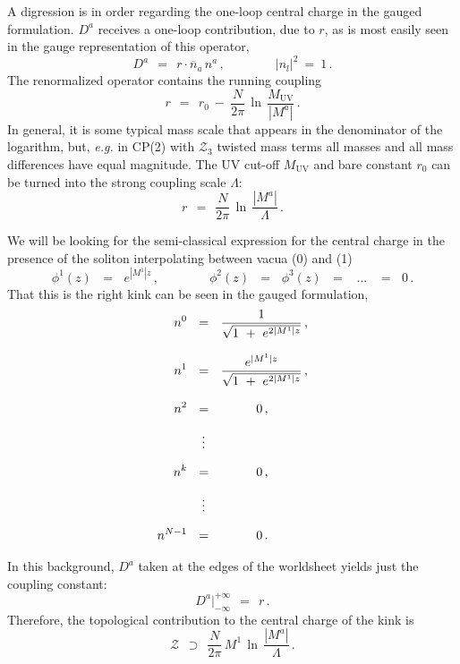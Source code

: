 \documentclass[epsfig,12pt]{article}
\def\beq{\begin{equation}}
\def\eeq{\end{equation}}
\def\beq{\begin{equation}}
\def\eeq{\end{equation}}
\newcommand{\ov}{\overline}
\newcommand{\mc}[1]{\mathcal{#1}}
\begin{document}
 
 
     
\newpage

A digression is in order regarding the one-loop central charge in the gauged formulation.
 $ D^a $ receives a one-loop contribution, due to $ r $, as is 
       most easily seen in the gauge representation of this operator,
\beq
       D^a  ~~=~~ r \cdot \ov{n}{}_a\, n^a \,,\qquad\qquad   | n_l |^2 ~=~ 1\,.
\eeq
       The renormalized operator contains the running coupling 
\beq
       r    ~~=~~ r_0  ~-~ \frac{N}{2\pi}\,\ln\, \frac{M_\text{UV}}
                                                      {   |M^a|   } \,.
\eeq
       In general, it is some typical mass scale that appears in the denominator of the logarithm, but, {\it e.g.}
       in CP(2) with $\mc{Z}_3$ twisted mass terms all masses and all mass differences have equal magnitude. 
       The UV cut-off $ M_\text{UV} $ and bare constant $ r_0 $ can be turned 
       into the strong coupling scale $ \Lambda $:
\beq
       r    ~~=~~ \frac{N}{2\pi}\, \ln\, \frac{   |M^a|   }
                                              {  \Lambda  }\,.
\eeq


       We will be looking for the semi-classical expression for the central charge in the presence
       of the soliton interpolating between vacua ({\sc \small 0}) and ({\sc \small 1})
\beq
       \phi^1(z)  \,~~=~~\, e^{|M^1| z}\,, \qquad\qquad  \phi^2(z) \,~~=~~\, \phi^3(z) \,~~=~~ \,~...~\, ~~=~~\, 0\,.
\eeq
       That this is the right kink can be seen in the gauged formulation,
\begin{align}
%
\notag
       n^0  & ~~=~~ \frac {             1              }
                          {\sqrt{ 1 ~+~ e^{2 |M^1| z} }}\,, \\[3mm]
%
\notag
       n^1  & ~~=~~ \frac {         e^{|M^1| z}        }
                          {\sqrt{ 1 ~+~ e^{2 |M^1| z} }}\,, \\[3mm]
%
\notag
       n^2  & ~~=~~ \qquad~~\, 0\,,  \\[2mm]
%	 
            & ~~~\,\vdots          \\[2mm]
%
\notag
       n^k  & ~~=~~ \qquad~~\, 0\,,  \\[2mm]
%	 
\notag
            & ~~~\,\vdots          \\[2mm]
%
\notag
       n^{N-1} & ~~=~~ \qquad~~\, 0\,.                
\end{align}

       In this background, $ D^a $ taken at the edges of the worldsheet yields just the coupling constant:
\beq
       D^a \Big|^{\scriptscriptstyle +\infty}_{\scriptscriptstyle -\infty} ~~=~~    r\,.
\eeq
       Therefore, the topological contribution to the central charge of the kink is
\beq
       \mc{Z} ~~\supset~~ \frac{N}{2\pi}\, M^1\, \ln\, \frac{   |M^a|   }
                                                            {  \Lambda  }\,.
\eeq
\end{document}
